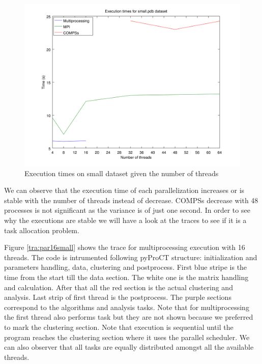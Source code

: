 \begin{figure}[h]
\includegraphics[width=\textwidth]{img/small_graphs.png}
\caption{Execution times on small dataset given the number of threads}
\label{fig:small}
\end{figure}

We can observe that the execution time of each parallelization increases or is stable with the number of threads instead of decrease. COMPSs decrease with 48 processes is not significant as the variance is of just one second. In order to see why the executions are stable we will have a look at the traces to see if it is a task allocation problem.

Figure \ref{tra:par16small} shows the trace for multiprocessing execution with 16 threads. The code is intrumented following pyProCT structure: initialization and parameters handling, data, clustering and postprocess. First blue stripe is the time from the start till the data section. The white one is the matrix handling and calculation. After that all the red section is the actual clustering and analysis. Last strip of first thread is the postprocess. The purple sections correspond to the algorithms and analysis tasks. Note that for multiprocessing the first thread also performs task but they are not shown because we preferred to mark the clustering section. Note that execution is sequential until the program reaches the clustering section where it uses the parallel scheduler. We can also observer that all tasks are equally distributed amongst all the available threads. 

